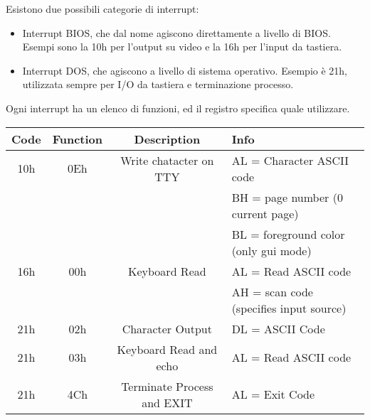\documentclass[../template]{subfiles}
\begin{document}
\newpage
\noindent
Esistono due possibili categorie di interrupt:
\begin{itemize}
    \item Interrupt BIOS, che dal nome agiscono direttamente a livello di BIOS.
        Esempi sono la 10h per l'output su video e la 16h per l'input da tastiera.
    \item Interrupt DOS, che agiscono a livello di sistema operativo.
        Esempio è 21h, utilizzata sempre per I/O da tastiera e terminazione processo.
\end{itemize}
Ogni interrupt ha un elenco di funzioni, ed il registro \ah specifica quale utilizzare.

\begin{center}
\begin{tabu}{|c|c|c|l|}
    \hline
    Code & Function & Description & Info \\
    \hline
    10h & 0Eh &Write chatacter on TTY & AL = Character ASCII code\\
        & & & BH = page number (0 current page) \\
        & & & BL = foreground color (only gui mode)\\
    \hline
    16h & 00h & Keyboard Read & AL = Read ASCII code\\
        &     &               & AH = scan code (specifies input source)\\
    \hline
    21h & 02h & Character Output & DL = ASCII Code\\
    \hline
    21h & 03h & Keyboard Read and echo & AL = Read ASCII code\\
    \hline
    21h & 4Ch & Terminate Process and EXIT & AL = Exit Code\\
    \hline
\end{tabu}
\end{center}
\end{document}
